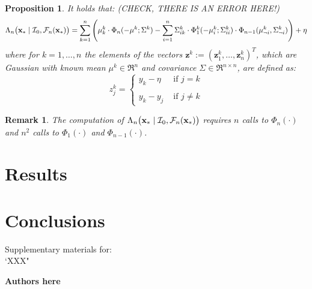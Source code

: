 \documentclass{article} %
\newcommand{\I}{\mathcal{I}}
\newcommand{\ud}{\mathrm{d}}
\newcommand{\N}{\mathcal{N}}
\newcommand{\future}{\mathcal{F}}
\newcommand{\IR}{\mathbb{R}}
\newcommand{\bz}{\textbf{z}}
\newtheorem{proposition}{Proposition}
\newtheorem{remark}{Remark}
\begin{document}
\begin{proposition}\label{prop:tallis}
It holds that:  (CHECK, THERE IS AN ERROR HERE!)
\begin{equation} \nonumber
\Lambda_n \bigl(\latentVector_* \mid \I_0, \future_{n}(\latentVector_*) \bigr) = \sum_{k=1}^n \left(  \mu^k_k \cdot \Phi_n ( -\mu^k; \Sigma^k) -  \sum_{i=1}^n \Sigma^k_{ik} \cdot \Phi^k_1(-\mu^k_i;\Sigma^k_{ii}) \cdot \Phi_{n-1}(\mu^k_{\neg i}, \Sigma^k_{\neg i}) \right) + \eta
\end{equation}
where for $k=1,\dots,n$ the elements of the vectors $\bz^k:= (\bz^k_1,\dots,\bz^k_n)^T$, which are Gaussian with known mean $\mu^k\in \Re^{n}$ and covariance $\Sigma \in \Re^{n \times n}$, are defined as:
$$z_j^k= \left\{ \begin{array}{lcl}
y_k - \eta & \mbox{ if } j=k \\
  \\
y_k - y_j  &   \mbox{ if } j \neq k
\end{array}
\right.$$
\end{proposition}

\begin{remark}
The computation of $\Lambda_n \bigl(\latentVector_* \mid \I_0, \future_{n}(\latentVector_*) \bigr)$ requires $n$ calls to $\Phi_n(\cdot)$ and $n^2$ calls to  $\Phi_1(\cdot)$ and  $\Phi_{n-1}(\cdot)$.
\end{remark}



\section{Results}


\section{Conclusions}




\clearpage
\setcounter{section}{0}
\setcounter{equation}{0}
\renewcommand{\thesection}{S\arabic{section}}
\renewcommand{\theequation}{S.\arabic{equation}}

\begin{center}
{\LARGE  Supplementary materials for:\\
`XXX"}
\end{center}
\begin{center}
\textbf{Authors here}
\end{center}
\end{document}
